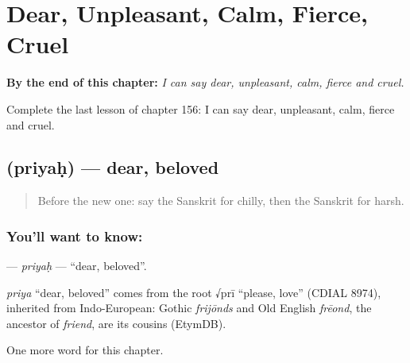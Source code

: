 
\chapter{Dear, Unpleasant, Calm, Fierce, Cruel}
\label{ch:sa-dear-unpleasant-calm-fierce-cruel}

\begin{chapteropening}
\textbf{By the end of this chapter:} \emph{I can say dear, unpleasant, calm, fierce and cruel.}

Complete the last lesson of chapter 156: I can say dear, unpleasant, calm, fierce and cruel.
\end{chapteropening}

\section[\texorpdfstring{\sk{प्रियः} (priyaḥ)}{प्रियः (priyaḥ)}]{ (priyaḥ) — dear, beloved}

\label{lesson:SA-C156-priyah}



\begin{quote}
Before the new one: say the Sanskrit for chilly, then the Sanskrit for harsh.
\end{quote}

\subsection*{You'll want to know: }
\textbf{} — \emph{priyaḥ} — \textquotedblleft{}dear, beloved\textquotedblright{}.

\begin{cousinweb}
\emph{priya} \textquotedblleft{}dear, beloved\textquotedblright{} comes from the root √prī \textquotedblleft{}please, love\textquotedblright{} (CDIAL 8974), inherited from Indo-European: Gothic \emph{frijōnds} and Old English \emph{frēond}, the ancestor of \emph{friend}, are its cousins (EtymDB).
\end{cousinweb}

\begin{grammarlens}[title={What you've built}]
One more word for this chapter.
\end{grammarlens}


